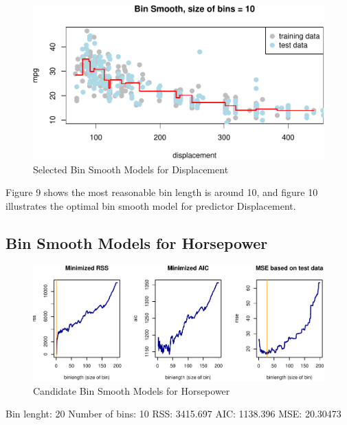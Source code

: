 \documentclass[]{article}
\begin{document}
\begin{figure}

{\centering \includegraphics{Report_files/figure-latex/bin-d-best-1} 

}

\caption{Selected Bin Smooth Models for Displacement}\label{fig:bin-d-best}
\end{figure}

Figure 9 shows the most reasonable bin length is around 10, and figure
10 illustrates the optimal bin smooth model for predictor Displacement.

\hypertarget{bin-smooth-models-for-horsepower}{%
\subsection{Bin Smooth Models for
Horsepower}\label{bin-smooth-models-for-horsepower}}

\begin{figure}

{\centering \includegraphics{Report_files/figure-latex/bin-h-1} 

}

\caption{Candidate Bin Smooth Models for Horsepower}\label{fig:bin-h}
\end{figure}

Bin lenght: 20 Number of bins: 10 RSS: 3415.697 AIC: 1138.396 MSE:
20.30473
\end{document}
